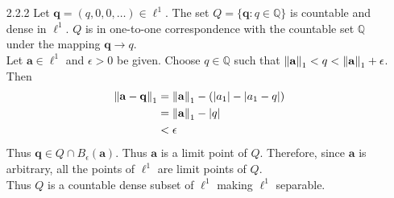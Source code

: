 \documentclass[../../Solutions.tex]{subfiles}
\begin{document}
\begin{itemize}
	
	\item [2.2.2] Let $\mathbf{q} = (q,0,0,\dots) \in \ell^1$.
		The set $Q = \{\mathbf{q} : q \in \mathbb{Q} \}$ is countable and dense in $\ell^1$.
		$Q$ is in one-to-one correspondence with the countable set $\mathbb{Q}$ under the mapping $\mathbf{q} \to q$. \\
		Let $\mathbf{a} \in \ell^1$ and $\epsilon > 0$ be given.
		Choose $q \in \mathbb{Q}$ such that $\left\lVert\mathbf{a}\right\rVert_1 < q < \left\lVert\mathbf{a}\right\rVert_1 + \epsilon$.
		Then
		\begin{equation*} \begin{split}
			\left\lVert\mathbf{a}-\mathbf{q}\right\rVert_1 & = \left\lVert\mathbf{a}\right\rVert_1-(|a_1|-|a_1-q|) \\
			& = \left\lVert\mathbf{a}\right\rVert_1 - |q| \\
			& < \epsilon
		\end{split} \end{equation*}
		Thus $\mathbf{q} \in Q \cap B_\epsilon(\mathbf{a})$.
		Thus $\mathbf{a}$ is a limit point of $Q$.
		Therefore, since $\mathbf{a}$ is arbitrary, all the points of $\ell^1$ are limit points of $Q$. \\
		Thus $Q$ is a countable dense subset of $\ell^1$ making $\ell^1$ separable.
	

\end{itemize}
\end{document}
